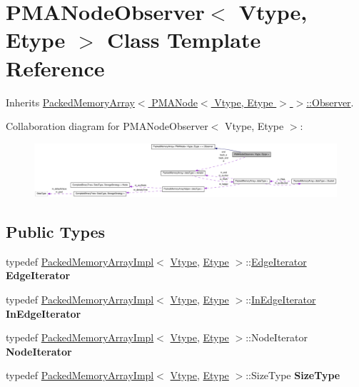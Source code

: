 \hypertarget{class_p_m_a_node_observer}{
\section{PMANodeObserver$<$ Vtype, Etype $>$ Class Template Reference}
\label{class_p_m_a_node_observer}
}


Inherits \hyperlink{class_packed_memory_array_1_1_observer}{PackedMemoryArray$<$ PMANode$<$ Vtype, Etype $>$ $>$::Observer}.



Collaboration diagram for PMANodeObserver$<$ Vtype, Etype $>$:\nopagebreak
\begin{figure}[H]
\begin{center}
\leavevmode
\includegraphics[width=400pt]{class_p_m_a_node_observer__coll__graph}
\end{center}
\end{figure}
\subsection*{Public Types}
\begin{DoxyCompactItemize}
\item 
\hypertarget{class_p_m_a_node_observer_a66fbc9d8192ee1c4a9942b067de664ec}{
typedef \hyperlink{class_packed_memory_array_impl}{PackedMemoryArrayImpl}$<$ \hyperlink{class_vtype}{Vtype}, \hyperlink{class_etype}{Etype} $>$::\hyperlink{class_packed_memory_array_1_1_iterator}{EdgeIterator} {\bfseries EdgeIterator}}
\label{class_p_m_a_node_observer_a66fbc9d8192ee1c4a9942b067de664ec}

\item 
\hypertarget{class_p_m_a_node_observer_adc3c37653212af0c3c7eb976d377bebf}{
typedef \hyperlink{class_packed_memory_array_impl}{PackedMemoryArrayImpl}$<$ \hyperlink{class_vtype}{Vtype}, \hyperlink{class_etype}{Etype} $>$::\hyperlink{class_packed_memory_array_1_1_iterator}{InEdgeIterator} {\bfseries InEdgeIterator}}
\label{class_p_m_a_node_observer_adc3c37653212af0c3c7eb976d377bebf}

\item 
\hypertarget{class_p_m_a_node_observer_acd96246a47486bb52c79d5e35eebe4d5}{
typedef \hyperlink{class_packed_memory_array_impl}{PackedMemoryArrayImpl}$<$ \hyperlink{class_vtype}{Vtype}, \hyperlink{class_etype}{Etype} $>$::NodeIterator {\bfseries NodeIterator}}
\label{class_p_m_a_node_observer_acd96246a47486bb52c79d5e35eebe4d5}

\item 
\hypertarget{class_p_m_a_node_observer_ae2500ea64e15174813e706e5be923502}{
typedef \hyperlink{class_packed_memory_array_impl}{PackedMemoryArrayImpl}$<$ \hyperlink{class_vtype}{Vtype}, \hyperlink{class_etype}{Etype} $>$::SizeType {\bfseries SizeType}}
\label{class_p_m_a_node_observer_ae2500ea64e15174813e706e5be923502}

\end{DoxyCompactItemize}
